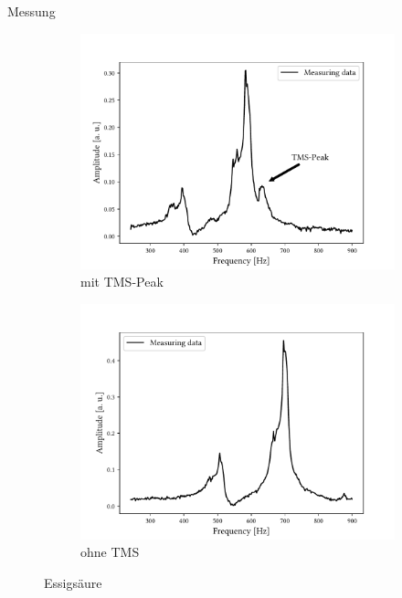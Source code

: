 \begin{frame}{Messung}
\begin{figure}
	\centering
	\begin{subfigure}{.49\textwidth}
	\centering
	\includegraphics[scale=.36]{..//figures//f61_abb_6.pdf}
	\caption{mit TMS-Peak}
	\end{subfigure}
	\begin{subfigure}{.49\textwidth}
	\centering
	\includegraphics[scale=.36]{..//figures//f61_abb_6_ohne.pdf}
	\caption{ohne TMS}
	\end{subfigure}	
	\caption{Essigsäure}
	\end{figure}
\end{frame}

